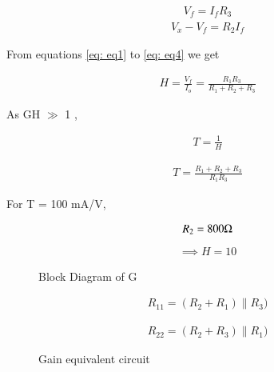 \begin{enumerate}[label=\arabic*.,ref=\theenumi]
\begin{align}
V_f = I_f R_3
\label{eq: eq3}
\end{align} 
\begin{align}
V_x - V_f = R_2 I_f
\label{eq: eq4}
\end{align} 

From equations \ref{eq: eq1} to \ref{eq: eq4} we get

\begin{align}
    H = \frac{V_f}{I_o}=\frac{R_1 R_3}{R_1+R_2+R_3}
    \label{eq:eq5}
\end{align}

As GH $\gg$ 1 ,


\begin{align}
    T = \frac{1}{H}
    \label{eq:eq6}
\end{align}


\begin{align}
    T = \frac{R_1+R_2+R_3}{R_1 R_3}
    \label{eq:eq6}
\end{align}

For T = 100 mA/V,

\begin{align}
    R_2 = 800 \ohm
    \label{eq:eq7}
\end{align}
\begin{align}
\implies H=10
\end{align}



\begin{figure}[!ht]
	\begin{center}
		\resizebox{\columnwidth}{!}{}
	\end{center}
\caption{Block Diagram of G}
\label{fig:fig5}
\end{figure}



\begin{align}
    R_{11} = (R_2+R_1)\|R_3)
\end{align}

\begin{align}
    R_{22} = (R_2+R_3)\|R_1)
\end{align}


\begin{figure}[!ht]
	\begin{center}
		\resizebox{\columnwidth}{!}{}
	\end{center}
\caption{Gain equivalent circuit}
\label{fig:fig6}
\end{figure}



\end{enumerate}
